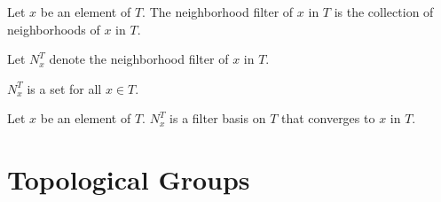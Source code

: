 \documentclass[11pt]{article}
\newcommand{\neigh}[2]{N^{#2}_{#1}}
\begin{document}
\begin{forthel}
\begin{definition} Let $x$ be an element of $T$.
The neighborhood filter of $x$ in $T$ is the collection of neighborhoods of $x$ in $T$.
\end{definition}

Let $\neigh{x}{T}$ denote the neighborhood filter of $x$ in $T$.

\begin{lemma}
$\neigh{x}{T}$ is a set for all $x \in T$.
\end{lemma}

\begin{lemma}
Let $x$ be an element of $T$. $\neigh{x}{T}$ is a filter basis on $T$ that converges
to $x$ in $T$.
\end{lemma}

\end{forthel}

\section{Topological Groups}
\end{document}
